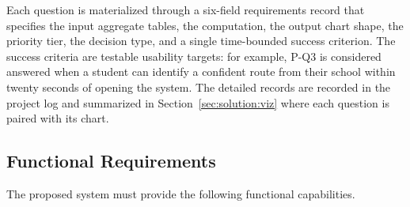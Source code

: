 Each question is materialized through a six-field requirements record that
specifies the input aggregate tables, the computation, the output chart
shape, the priority tier, the decision type, and a single time-bounded
success criterion. The success criteria are testable usability targets: for
example, P-Q3 is considered answered when a student can identify a confident
route from their school within twenty seconds of opening the system. The
detailed records are recorded in the project log and summarized in
Section~\ref{sec:solution:viz} where each question is paired with its chart.

\subsection{Functional Requirements}
\label{sec:solution:problem:functional}

The proposed system must provide the following functional capabilities.

